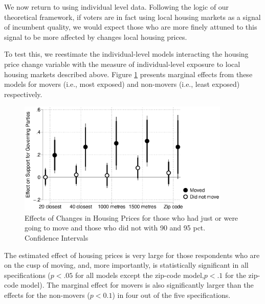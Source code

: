 \documentclass[12pt,a4paper]{article}
\begin{document}
	We now return to \htwo using individual level data. Following the logic of our theoretical framework, 	if voters are in fact using local housing markets as a signal of incumbent quality, we would expect those who are more finely attuned to this signal to be more affected by changes local housing prices.
	
	To test this, we reestimate the individual-level models interacting the housing price change variable with the measure of individual-level exposure to local housing markets described above. Figure \ref{move} presents marginal effects from these models for movers (i.e., most exposed) and non-movers (i.e., least exposed) respectively.
	
		\begin{figure}[htbp!]
		\includegraphics[width=0.9\textwidth]{../figures/moving.eps}
		\centering
		\caption{Effects of Changes in Housing Prices for those who had just or were going to move and those who did not with 90 and 95 pct. Confidence Intervals}\label{move}
	\end{figure}
	
	
The estimated effect of housing prices is very large for those respondents who are on the cusp of moving, and, more importantly, is statistically significant in all specifications ($p<.05$ for all models except the zip-code model,$p<.1$ for the zip-code model). The marginal effect for movers is also significantly larger than the effects for the non-movers ($p<0.1$) in four out of the five specifications.
	
\end{document}
